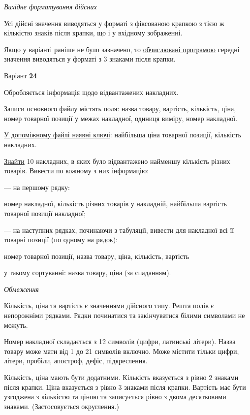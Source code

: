 \documentclass[11pt, ukrainian]{article}
\begin{document}
\textit{Вихідне форматування дійсних}

Усі дійсні значення виводяться у форматі з фіксованою крапкою з тією ж кількістю знаків після крапки, що і у вхідному зображенні.

Якщо у варіанті раніше не було зазначено, то \underline{обчислювані програмою} середні значення виводяться у форматі з 3 знаками після крапки.




\par
\newpage
{\center Варіант  \No \textbf { 24 }\par}
\bigskip
Обробляється інформація щодо відвантажених накладних.

\underline{Записи основного файлу містять поля}: назва товару, вартість, кількість, ціна, номер товарної позиції у межах накладної, одиниця виміру, номер накладної.

\underline{У допоміжному файлі наявні ключі}: найбільша ціна товарної позиції, кількість накладних.

\underline{Знайти} 10 накладних, в яких було відвантажено найменшу кількість різних товарів. Вивести по кожному з них інформацію:\par
{\noindent}--- на першому рядку:\par
номер накладної, кількість різних товарів у накладній, найбільша вартість товарної позиції накладної;

{\noindent}--- на наступних рядках, починаючи з табуляції, вивести для накладної всі її товарні позиції (по одному на рядок):\par
номер товарної позиції, назва товару, ціна, кількість, вартість

{\noindent}у такому сортуванні: назва товару, ціна (за спаданням).


\bigskip\textit{Обмеження}

Кількість, ціна та вартість є значеннями дійсного типу.
Решта полів є непорожніми рядками.
Рядки починатися та закінчуватися білими символами не можуть.

Номер накладної складається з 12 символів (цифри, латинські літери).
Назва товару може мати від 1 до 21 символів включно.
Може містити тільки цифри, літери, пробіли, апостроф, дефіс, підкреслення.

Кількість, ціна мають бути додатними.
Кількість вказується з рівно 2 знаками після крапки.
Ціна вказується з рівно 3 знаками після крапки.
Вартість має бути узгоджена з кількістю та ціною та записується рівно з двома десятковими знаками.
(Застосовується округлення.)
\end{document}
